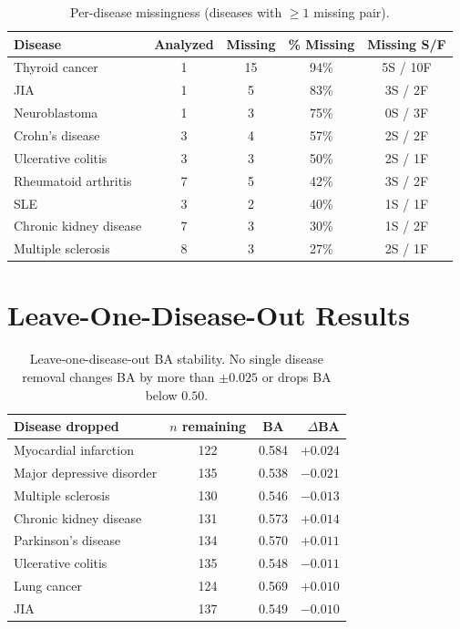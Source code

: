 \documentclass[11pt]{article}
\begin{document}
\vspace{1em}
\begin{table}[h]
\centering
\caption{Per-disease missingness (diseases with $\geq 1$ missing pair).}
\label{tab:miss_disease}
\small
\begin{tabular}{lcccc}
\toprule
Disease & Analyzed & Missing & \% Missing & Missing S/F \\
\midrule
Thyroid cancer & 1 & 15 & 94\% & 5S / 10F \\
JIA & 1 & 5 & 83\% & 3S / 2F \\
Neuroblastoma & 1 & 3 & 75\% & 0S / 3F \\
Crohn's disease & 3 & 4 & 57\% & 2S / 2F \\
Ulcerative colitis & 3 & 3 & 50\% & 2S / 1F \\
Rheumatoid arthritis & 7 & 5 & 42\% & 3S / 2F \\
SLE & 3 & 2 & 40\% & 1S / 1F \\
Chronic kidney disease & 7 & 3 & 30\% & 1S / 2F \\
Multiple sclerosis & 8 & 3 & 27\% & 2S / 1F \\
\bottomrule
\end{tabular}
\end{table}

\section{Leave-One-Disease-Out Results}
\label{app:lodo}

\vspace{1em}
\begin{table}[h]
\centering
\caption{Leave-one-disease-out BA stability. No single disease removal changes BA by more than $\pm 0.025$ or drops BA below $0.50$.}
\label{tab:lodo}
\small
\begin{tabular}{lccr}
\toprule
Disease dropped & $n$ remaining & BA & $\Delta$BA \\
\midrule
Myocardial infarction & 122 & 0.584 & $+0.024$ \\
Major depressive disorder & 135 & 0.538 & $-0.021$ \\
Multiple sclerosis & 130 & 0.546 & $-0.013$ \\
Chronic kidney disease & 131 & 0.573 & $+0.014$ \\
Parkinson's disease & 134 & 0.570 & $+0.011$ \\
Ulcerative colitis & 135 & 0.548 & $-0.011$ \\
Lung cancer & 124 & 0.569 & $+0.010$ \\
JIA & 137 & 0.549 & $-0.010$ \\
\bottomrule
\end{tabular}
\end{table}
\end{document}
